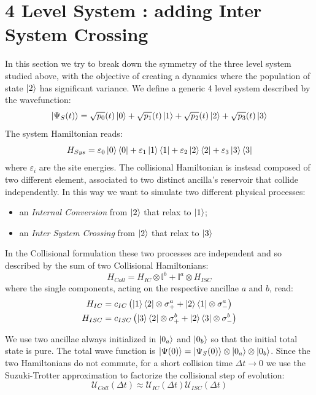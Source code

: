 \documentclass[a4paper,12pt]{article}
\begin{document}
\section{4 Level System : adding Inter System Crossing}
\label{sec:4_Level_System}
In this section we try to break down the symmetry of the three level system studied above, with the objective of creating a dynamics where the population of state $ \ket{2} $ has significant variance.
We define a generic 4 level system described by the wavefunction: 
\begin{equation}
	\ket{\Psi_{S}(t)} = \sqrt{p_{0}}(t) \ket{0} + \sqrt{p_{1}}(t) \ket{1} + \sqrt{p_{2}}(t) \ket{2} + \sqrt{p_{3}}(t) \ket{3}
\end{equation}
The system Hamiltonian reads: 
\begin{equation}
	H_{Sys} = \varepsilon_{0} \ket{0}\bra{0} + \varepsilon_{1} \ket{1}\bra{1} + \varepsilon_{2} \ket{2}\bra{2} + \varepsilon_{3} \ket{3}\bra{3}
\end{equation}
where $ \varepsilon_{i} $ are the site energies.
The collisional Hamiltonian is instead composed of two different element, associated to two distinct ancilla's reservoir that collide independently. In this way we want to simulate two different physical processes: 
\begin{itemize}
	\item an \textit{Internal Conversion} from $ \ket{2} $ that relax to $ \ket{1} $;
	\item an \textit{Inter System Crossing} from $ \ket{2} $ that relax to $ \ket{3} $
\end{itemize}

In the Collisional formulation these two processes are independent and so described by the sum of two Collisional Hamiltonians:
\begin{equation}
	H_{Coll} = H_{IC} \otimes \mathbb{I}^{b} + \mathbb{I}^{a} \otimes H_{ISC}
\end{equation}
where the single components, acting on the respective ancillae $ a $ and $ b $, read:
\begin{gather}
	H_{IC} = c_{IC} \left( \ket{1}\bra{2} \otimes \sigma_{+}^{a} + \ket{2}\bra{1} \otimes \sigma_{-}^{a} \right) \\
	H_{ISC} = c_{ISC} \left( \ket{3}\bra{2} \otimes \sigma_{+}^{b} + \ket{2}\bra{3} \otimes \sigma_{-}^{b} \right)
\end{gather}

We use two ancillae always initialized in $ \ket{0_{a}} $ and $ \ket{0_{b}} $ so that the initial total state is pure.
The total wave function is $ \ket{\Psi (0)} = \ket{\Psi_{S} (0)} \otimes \ket{0_{a}} \otimes \ket{0_{b}} $. \newline
Since the two Hamiltonians do not commute, for a short collision time $ \Delta t \to 0 $ we use the Suzuki-Trotter approximation to factorize the collisional step of evolution:
\begin{equation}
	\mathcal{U}_{Coll} \left( \Delta t \right) \approx \mathcal{U}_{IC} \left( \Delta t \right) \mathcal{U}_{ISC} \left( \Delta t \right)
\end{equation}
\end{document}

